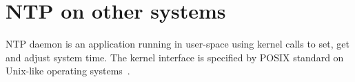 
\chapter{NTP on other systems}
NTP daemon is an application running in user-space using kernel calls to set, get and
adjust system time.
The kernel interface is specified by POSIX standard on Unix-like operating systems~\cite{posix}.




